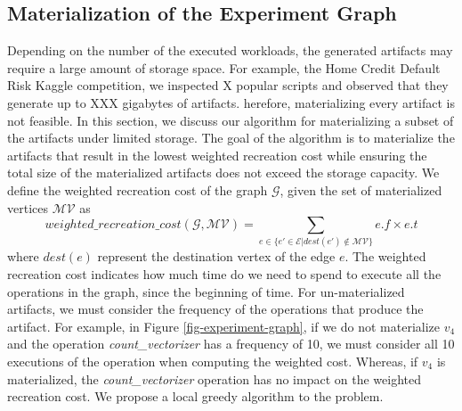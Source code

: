 \subsection{Materialization of the Experiment Graph}\label{subsec-materialization}
Depending on the number of the executed workloads, the generated artifacts may require a large amount of storage space.
For example, the Home Credit Default Risk Kaggle competition, we inspected X popular scripts and observed that they generate up to XXX gigabytes of artifacts. 
herefore, materializing every artifact is not feasible.
In this section, we discuss our algorithm for materializing a subset of the artifacts under limited storage.
The goal of the algorithm is to materialize the artifacts that result in the lowest weighted recreation cost while ensuring the total size of the materialized artifacts does not exceed the storage capacity.
We define the weighted recreation cost of the graph $\mathcal{G}$, given the set of materialized vertices $\mathcal{MV}$ as 
\[
weighted\_recreation\_cost(\mathcal{G}, \mathcal{MV}) =  \sum\limits_{e \in \{e' \in \mathcal{E}  \lvert dest(e') \notin \mathcal{MV}\}}  e.f \times e.t
\]
where $dest(e)$ represent the destination vertex of the edge $e$.
The weighted recreation cost indicates how much time do we need to spend to execute all the operations in the graph, since the beginning of time.
For un-materialized artifacts, we must consider the frequency of the operations that produce the artifact.
For example, in Figure \ref{fig-experiment-graph}, if we do not materialize $v_4$ and the operation \textit{count\_vectorizer} has a frequency of 10, we must consider all 10 executions of the operation when computing the weighted cost.
Whereas, if $v_4$ is materialized, the \textit{count\_vectorizer} operation has no impact on the weighted recreation cost.
We propose a local greedy algorithm to the problem.

